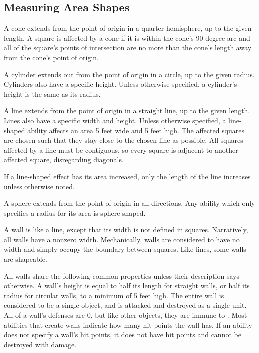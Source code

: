   \subsection{Measuring Area Shapes}\label{Area Shapes}

     A cone extends from the point of origin in a quarter-hemisphere, up to the given length.
    A square is affected by a cone if it is within the cone's 90 degree arc and all of the square's points of intersection are no more than the cone's length away from the cone's point of origin.

     A cylinder extends out from the point of origin in a circle, up to the given radius.
    Cylinders also have a specific height.
    Unless otherwise specified, a cylinder's height is the same as its radius.

     A line extends from the point of origin in a straight line, up to the given length.
    Lines also have a specific width and height.
    Unless otherwise specified, a line-shaped ability affects an area 5 feet wide and 5 feet high.
    The affected squares are chosen such that they stay close to the chosen line as possible.
    All squares affected by a line must be contiguous, so every square is adjacent to another affected square, disregarding diagonals.

    If a line-shaped effect has its area increased, only the length of the line increases unless otherwise noted.

     A sphere extends from the point of origin in all directions.
    Any ability which only specifies a radius for its area is sphere-shaped.

     A wall is like a line, except that its width is not defined in squares.
    Narratively, all walls have a nonzero width.
    Mechanically, walls are considered to have no width and simply occupy the boundary between squares.
    Like lines, some walls are shapeable.

    All walls share the following common properties unless their description says otherwise.
    A wall's height is equal to half its length for straight walls, or half its radius for circular walls, to a minimum of 5 feet high.
    The entire wall is considered to be a single object, and is attacked and destroyed as a single unit.
    All of a wall's defenses are 0, but like other objects, they are immune to .
    Most abilities that create walls indicate how many hit points the wall has.
    If an ability does not specify a wall's hit points, it does not have hit points and cannot be destroyed with damage.

